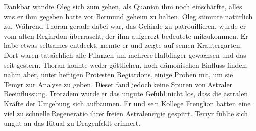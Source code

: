 Dankbar wandte Oleg sich zum gehen, als Quanion ihm noch einschärfte, alles was er ihm gegeben hatte vor Bormund geheim zu halten. Oleg stimmte natürlich zu. Während Thoran gerade dabei war, das Gelände zu patrouillieren, wurde er vom alten Regiardon überrascht, der ihm aufgeregt bedeutete mitzukommen. Er habe etwas seltsames entdeckt, meinte er und zeigte auf seinen Kräutergarten. Dort waren tatsächlich alle Pflanzen um mehrere Halbfinger gewachsen und das seit gestern. Thoran konnte weder göttlichen, noch dämonischen Einfluss finden, nahm aber, unter heftigen Protesten Regiardons, einige Proben mit, um sie Temyr zur Analyse zu geben. Dieser fand jedoch keine Spuren von Astraler Beeinflussung. Trotzdem wurde er das ungute Gefühl nicht los, dass die astralen Kräfte der Umgebung sich aufbäumen. Er und sein Kollege Frenglion hatten eine viel zu schnelle Regeneratio ihrer freien Astralenergie gespürt. Temyr fühlte sich ungut an das Ritual zu Dragenfeldt erinnert.\par

